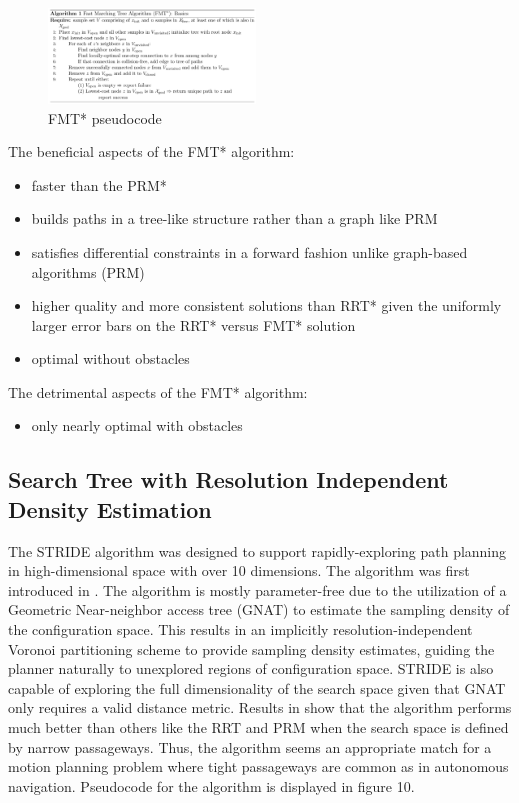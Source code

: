 \documentclass[conference]{IEEEtran} \usepackage[T1]{fontenc} \usepackage[backend=biber, style=ieee]{biblatex}
\begin{document}
\begin{figure}
\label{figure9} 
\centering 
\includegraphics[width=0.49\textwidth]{fmt_star}
\caption{FMT* pseudocode}
\end{figure}

The beneficial aspects of the FMT* algorithm:
\begin{itemize}
 \item faster than the PRM*
 \item builds paths in a tree-like structure rather than a graph like PRM
 \item satisfies differential constraints in a forward fashion unlike graph-based algorithms (PRM)
 \item higher quality and more consistent solutions than RRT* given the uniformly larger error bars on the RRT* versus FMT* solution
 \item optimal without obstacles
\end{itemize}

The detrimental aspects of the FMT* algorithm:
\begin{itemize}
 \item only nearly optimal with obstacles
\end{itemize}

\subsection{Search Tree with Resolution Independent Density Estimation} \label{STRIDE}
The STRIDE algorithm was designed to support rapidly-exploring path planning in high-dimensional space with over 10 dimensions. The algorithm was first introduced
in \cite{stride}. The algorithm is mostly parameter-free due to the utilization of a Geometric Near-neighbor access tree (GNAT) to estimate the sampling density of the 
configuration space. This results in an implicitly resolution-independent Voronoi partitioning scheme to provide sampling density estimates, guiding the planner 
naturally to unexplored regions of configuration space. STRIDE is also capable of exploring the full dimensionality of the search space given that GNAT only requires a 
valid distance metric. Results in \cite{stride} show that the algorithm performs much better than others like the RRT and PRM when the search space is defined
by narrow passageways. Thus, the algorithm seems an appropriate match for a motion planning problem where tight passageways are common as in autonomous navigation.
Pseudocode for the algorithm is displayed in figure 10.
\end{document}
